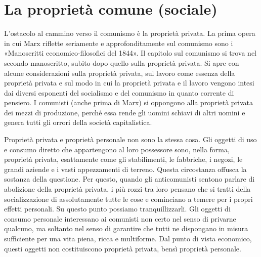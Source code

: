 \documentclass[../main]{subfiles}
\begin{document}
\ifSubfilesClassLoaded{\setcounter{page}{27}}{}
\section{La proprietà comune (sociale)}
\label{sec:05_proprieta_comune}

L'ostacolo al cammino verso il comunismo è la proprietà privata. La prima opera in cui Marx riflette seriamente e approfonditamente sul comunismo sono i «Manoscritti economico-filosofici del 1844». Il capitolo sul comunismo si trova nel secondo manoscritto, subito dopo quello sulla proprietà privata. Si apre con alcune considerazioni sulla proprietà privata, sul lavoro come essenza della proprietà privata e sul modo in cui la proprietà privata e il lavoro vengono intesi dai diversi esponenti del socialismo e del comunismo in quanto corrente di pensiero. I comunisti (anche prima di Marx) si oppongono alla proprietà privata dei mezzi di produzione, perché essa rende gli uomini schiavi di altri uomini e genera tutti gli orrori della società capitalistica.

Proprietà privata e proprietà personale non sono la stessa cosa. Gli oggetti di uso e consumo diretto che appartengono al loro possessore sono, nella forma, proprietà privata, esattamente come gli stabilimenti, le fabbriche, i negozi, le grandi aziende e i vasti appezzamenti di terreno. Questa circostanza offusca la sostanza della questione. Per questo, quando gli anticomunisti sentono parlare di abolizione della proprietà privata, i più rozzi tra loro pensano che si tratti della socializzazione di assolutamente tutte le cose e cominciano a temere per i propri effetti personali. Su questo punto possiamo tranquillizzarli. Gli oggetti di consumo personale interessano ai comunisti non certo nel senso di privarne qualcuno, ma soltanto nel senso di garantire che tutti ne dispongano in misura sufficiente per una vita piena, ricca e multiforme. Dal punto di vista economico, questi oggetti non costituiscono proprietà privata, bensì proprietà personale.
\end{document}
